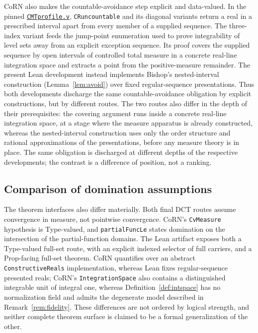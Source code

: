 \documentclass[11pt]{article}
\theoremstyle{definition}
\theoremstyle{remark}
\begin{document}
CoRN also makes the countable-avoidance step explicit and data-valued.  In the pinned \href{https://github.com/rocq-community/corn/blob/ada7c0b497ff15dd67cf7932c6f20e143a2aee2f/reals/stdlib/CMTprofile.v}{\texttt{CMTprofile.v}}, \texttt{CRuncountable} and its diagonal variants return a real in a prescribed interval apart from every member of a supplied sequence.  The three-index variant feeds the jump-point enumeration used to prove integrability of level sets away from an explicit exception sequence.  Its proof covers the supplied sequence by open intervals of controlled total measure in a concrete real-line integration space and extracts a point from the positive-measure remainder.  The present Lean development instead implements Bishop's nested-interval construction (Lemma~\ref{lem:avoid}) over fixed regular-sequence presentations.  Thus both developments discharge the same countable-avoidance obligation by explicit constructions, but by different routes.  The two routes also differ in the depth of their prerequisites: the covering argument runs inside a concrete real-line integration space, at a stage where the measure apparatus is already constructed, whereas the nested-interval construction uses only the order structure and rational approximations of the presentations, before any measure theory is in place.  The same obligation is discharged at different depths of the respective developments; the contrast is a difference of position, not a ranking.

\subsection{Comparison of domination assumptions}
\label{sec:domination-comparison}
The theorem interfaces also differ materially.  Both final DCT routes assume convergence in measure, not pointwise convergence.  CoRN's \texttt{CvMeasure} hypothesis is Type-valued, and \texttt{partialFuncLe} states domination on the intersection of the partial-function domains.  The Lean artifact exposes both a Type-valued full-set route, with an explicit indexed selector of full carriers, and a Prop-facing full-set theorem.  CoRN quantifies over an abstract \texttt{ConstructiveReals} implementation, whereas Lean fixes regular-sequence presented reals; CoRN's \texttt{IntegrationSpace} also contains a distinguished integrable unit of integral one, whereas Definition~\ref{def:intspace} has no normalization field and admits the degenerate model described in Remark~\ref{rem:fidelity}.  These differences are not ordered by logical strength, and neither complete theorem surface is claimed to be a formal generalization of the other.
\end{document}
